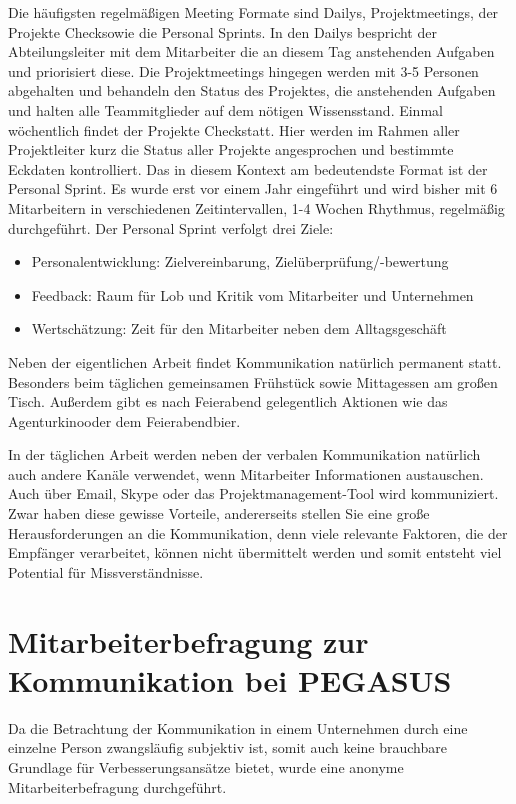 \documentclass[12pt, DIV9, BCOR9mm, onecolumn, headsepline, ngerman]{scrreprt}
\begin{document}
Die häufigsten regelmäßigen Meeting Formate sind Dailys, Projektmeetings, der \glqq Projekte Check\grqq sowie die \glqq Personal Sprints\grqq. In den Dailys bespricht der Abteilungsleiter mit dem Mitarbeiter die an diesem Tag anstehenden Aufgaben und priorisiert diese. Die Projektmeetings hingegen werden mit 3-5 Personen abgehalten und behandeln den Status des Projektes, die anstehenden Aufgaben und halten alle Teammitglieder auf dem nötigen Wissensstand.
Einmal wöchentlich findet der \glqq Projekte Check\grqq statt. Hier werden im Rahmen aller Projektleiter kurz die Status aller Projekte angesprochen und bestimmte Eckdaten kontrolliert. 
Das in diesem Kontext am bedeutendste Format ist der \glqq Personal Sprint\grqq. Es wurde erst vor einem Jahr eingeführt und wird bisher mit 6 Mitarbeitern in verschiedenen Zeitintervallen, 1-4 Wochen Rhythmus, regelmäßig durchgeführt. 
Der Personal Sprint verfolgt drei Ziele:

\begin{itemize}
\item Personalentwicklung: Zielvereinbarung, Zielüberprüfung/-bewertung
\item Feedback: Raum für Lob und Kritik vom Mitarbeiter und Unternehmen
\item Wertschätzung: Zeit für den Mitarbeiter neben dem Alltagsgeschäft
\end{itemize}

Neben der eigentlichen Arbeit findet Kommunikation natürlich permanent statt. Besonders beim täglichen gemeinsamen Frühstück sowie Mittagessen am großen Tisch. Außerdem gibt es nach Feierabend gelegentlich Aktionen wie das \glqq Agenturkino\grqq oder dem \glqq Feierabendbier\grqq.

In der täglichen Arbeit werden neben der verbalen Kommunikation natürlich auch andere Kanäle verwendet, wenn Mitarbeiter Informationen austauschen. Auch über Email, Skype oder das Projektmanagement-Tool wird kommuniziert. Zwar haben diese gewisse Vorteile, andererseits stellen Sie eine große Herausforderungen an die Kommunikation, denn viele relevante Faktoren, die der Empfänger verarbeitet, können nicht übermittelt werden und somit entsteht viel Potential für Missverständnisse.


\section{Mitarbeiterbefragung zur Kommunikation bei PEGASUS} 
Da die Betrachtung der Kommunikation in einem Unternehmen durch eine einzelne Person zwangsläufig subjektiv ist, somit auch keine brauchbare Grundlage für Verbesserungsansätze bietet, wurde eine anonyme Mitarbeiterbefragung durchgeführt.\\
\end{document}
